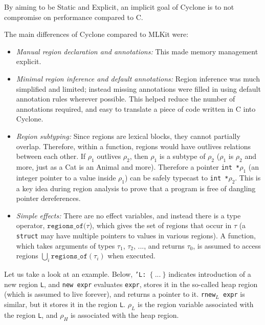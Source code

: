 \documentclass[11pt]{report}
\begin{document}
By aiming to be Static and Explicit, an implicit goal of Cyclone is to not compromise on performance compared to C.

The main differences of Cyclone compared to MLKit were:

\begin{itemize}
\item \textit{Manual region declaration and annotations:} This made memory management explicit.
\item \textit{Minimal region inference and default annotations:} Region inference was much simplified and limited; instead missing annotations were filled in using default annotation rules wherever possible. This helped reduce the number of annotations required, and easy to translate a piece of code written in C into Cyclone.
\item \textit{Region subtyping:} Since regions are lexical blocks, they cannot partially overlap. Therefore, within a function, regions would have outlives relations between each other. If $\rho_1$ outlives $\rho_2$, then $\rho_1$ is a subtype of $\rho_2$ ($\rho_1$ is $\rho_2$ and more, just as a Cat is an Animal and more). Therefore a pointer \texttt{int *$\rho_1$} (an integer pointer to a value inside $\rho_1$) can be safely typecast to \texttt{int *$\rho_2$}. This is a key idea during region analysis to prove that a program is free of dangling pointer dereferences.
\item \textit{Simple effects:} There are no effect variables, and instead there is a type operator, $\mathtt{regions\_of}(\tau$), which gives the set of regions that occur in $\tau$ (a \texttt{struct} may have multiple pointers to values in various regions). A function, which takes arguments of types $\tau_1$, $\tau_2$, ..., and returns $\tau_0$, is assumed to access regions $\bigcup\limits_{i} \mathtt{regions\_of}(\tau_i)$ when executed.
\end{itemize}


\newcommand{\snippet}[1] {\textcolor{code}{\texttt{#1}}}

Let us take a look at an example. Below, \snippet{'L: $\{~...~\}$} indicates introduction of a new region \snippet{L}, and \snippet{new expr} evaluates \snippet{expr}, stores it in the so-called heap region (which is assumed to live forever), and returns a pointer to it. \snippet{rnew$_L$ expr} is similar, but it stores it in the region \snippet{L}. $\rho_L$ is the region variable associated with the region \snippet{L}, and $\rho_H$ is associated with the heap region.
\end{document}

